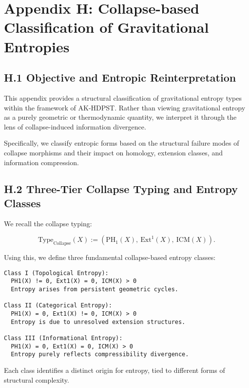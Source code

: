 \documentclass[11pt]{article}
\begin{document}
\section*{Appendix H: Collapse-based Classification of Gravitational Entropies}

\subsection*{H.1 Objective and Entropic Reinterpretation}

This appendix provides a structural classification of gravitational entropy types within the framework of AK-HDPST. Rather than viewing gravitational entropy as a purely geometric or thermodynamic quantity, we interpret it through the lens of collapse-induced information divergence.

Specifically, we classify entropic forms based on the structural failure modes of collapse morphisms and their impact on homology, extension classes, and information compression.

\subsection*{H.2 Three-Tier Collapse Typing and Entropy Classes}

We recall the collapse typing:

\[
\mathrm{Type}_{\mathrm{Collapse}}(X) := (\mathrm{PH}_1(X),\ \mathrm{Ext}^1(X),\ \mathrm{ICM}(X)).
\]

Using this, we define three fundamental collapse-based entropy classes:

\begin{lstlisting}
Class I (Topological Entropy):
  PH1(X) != 0, Ext1(X) = 0, ICM(X) > 0
  Entropy arises from persistent geometric cycles.

Class II (Categorical Entropy):
  PH1(X) = 0, Ext1(X) != 0, ICM(X) > 0
  Entropy is due to unresolved extension structures.

Class III (Informational Entropy):
  PH1(X) = 0, Ext1(X) = 0, ICM(X) > 0
  Entropy purely reflects compressibility divergence.
\end{lstlisting}

Each class identifies a distinct origin for entropy, tied to different forms of structural complexity.
\end{document}
